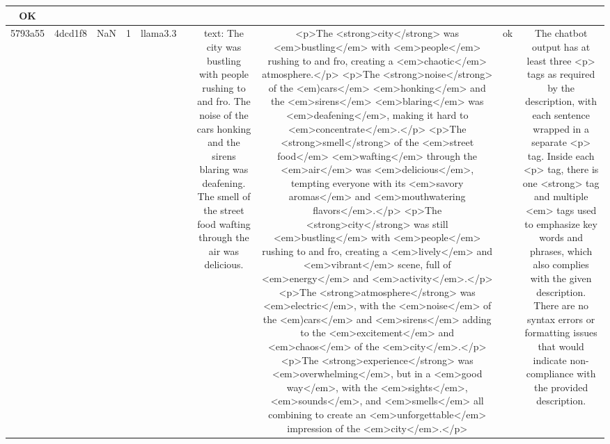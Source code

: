 \begin{table}[h!]
\begin{tabular}{|c|c|c|c|c|c|c|c|c|c|}
OK\\
\hline
5793a55 & 4dcd1f8 & NaN & 1 & llama3.3 &  & text: The city was bustling with people rushing to and fro. The noise of the cars honking and the sirens blaring was deafening. The smell of the street food wafting through the air was delicious. & <p>The <strong>city</strong> was <em>bustling</em> with <em>people</em> rushing to and fro, creating a <em>chaotic</em> atmosphere.</p>
<p>The <strong>noise</strong> of the <em)cars</em> <em>honking</em> and the <em>sirens</em> <em>blaring</em> was <em>deafening</em>, making it hard to <em>concentrate</em>.</p>
<p>The <strong>smell</strong> of the <em>street food</em> <em>wafting</em> through the <em>air</em> was <em>delicious</em>, tempting everyone with its <em>savory aromas</em> and <em>mouthwatering flavors</em>.</p>
<p>The <strong>city</strong> was still <em>bustling</em> with <em>people</em> rushing to and fro, creating a <em>lively</em> and <em>vibrant</em> scene, full of <em>energy</em> and <em>activity</em>.</p>
<p>The <strong>atmosphere</strong> was <em>electric</em>, with the <em>noise</em> of the <em)cars</em> and <em>sirens</em> adding to the <em>excitement</em> and <em>chaos</em> of the <em>city</em>.</p>
<p>The <strong>experience</strong> was <em>overwhelming</em>, but in a <em>good way</em>, with the <em>sights</em>, <em>sounds</em>, and <em>smells</em> all combining to create an <em>unforgettable</em> impression of the <em>city</em>.</p> & ok & The chatbot output has at least three <p> tags as required by the description, with each sentence wrapped in a separate <p> tag. Inside each <p> tag, there is one <strong> tag and multiple <em> tags used to emphasize key words and phrases, which also complies with the given description. There are no syntax errors or formatting issues that would indicate non-compliance with the provided description.


\end{tabular}
\end{table}
